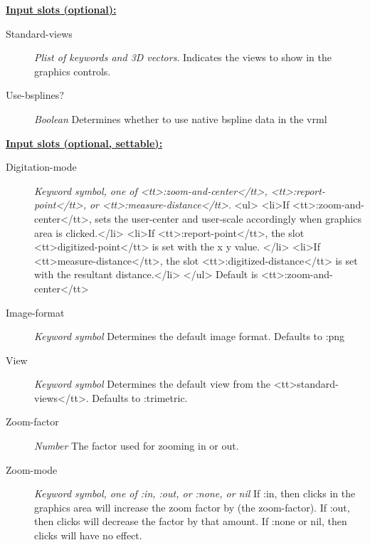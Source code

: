\documentclass [11pt]{book}
\begin{document}
\begin{itemize}
\textbf{
\underline{Input slots (optional):}}

\begin{description}

\item [Standard-views]
\emph{Plist of keywords and 3D vectors}.
Indicates the views to show in the graphics controls.


\item [Use-bsplines?]
\emph{Boolean} Determines whether to use native bspline data in the vrml


\end{description}






\textbf{
\underline{Input slots (optional, settable):}}

\begin{description}

\item [Digitation-mode]
\emph{Keyword symbol, one of <tt>:zoom-and-center</tt>, <tt>:report-point</tt>, or <tt>:measure-distance</tt>}.
<ul>
<li>If <tt>:zoom-and-center</tt>, sets the user-center and user-scale accordingly when graphics
area is clicked.</li>
<li>If <tt>:report-point</tt>, the slot <tt>digitized-point</tt> is set with the x y value. </li>
<li>If <tt>measure-distance</tt>, the slot <tt>:digitized-distance</tt> is set with the resultant distance.</li>
</ul>
Default is <tt>:zoom-and-center</tt>


\item [Image-format]
\emph{Keyword symbol} Determines the default image format. Defaults to :png


\item [View]
\emph{Keyword symbol} Determines the default view from the <tt>standard-views</tt>. Defaults to :trimetric.


\item [Zoom-factor]
\emph{Number} The factor used for zooming in or out.


\item [Zoom-mode]
\emph{Keyword symbol, one of :in, :out, or :none, or nil} If :in, then clicks
in the graphics area will increase the zoom factor by (the zoom-factor). If :out,
then clicks will decrease the factor by that amount. If :none or nil, then clicks
will have no effect.



\end{description}
\end{itemize}
\end{document}
